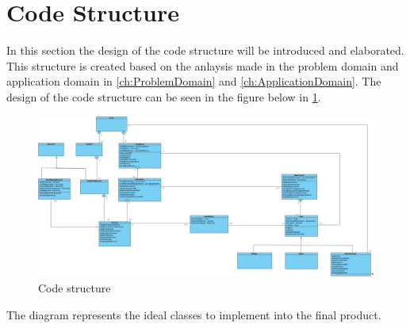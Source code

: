 \section{Code Structure} \label{sec:codestructure}

In this section the design of the code structure will be introduced and elaborated.
This structure is created based on the anlaysis made in the problem domain and application domain in \cref{ch:ProblemDomain} and \ref{ch:ApplicationDomain}.
The design of the code structure can be seen in the figure below in \cref{fig:codestructure}.

\begin{figure}[H]
	\centering
	\includegraphics[width=1.2\textwidth]{billeder/codestructure.jpg}
	\caption{Code structure\label{fig:codestructure}}
\end{figure}

The diagram represents the ideal classes to implement into the final product.
